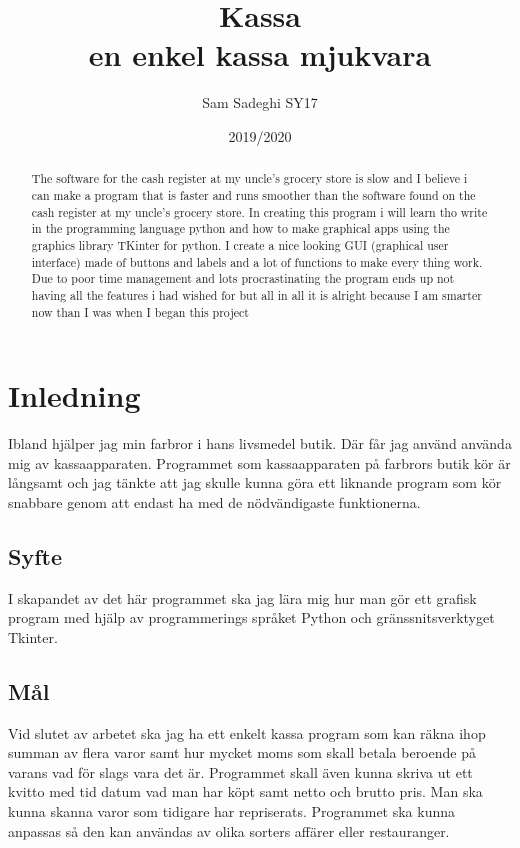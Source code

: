 \documentclass[a4paper, 12pt]{article}
\title{Kassa\\\large en enkel kassa mjukvara}
\author{Sam Sadeghi SY17}
\date{2019/2020}
\begin{document}
\begin{titlepage}
\maketitle
\end{titlepage}


\begin{abstract}
The software for the cash register at my uncle's grocery store is slow and I believe i can make a program that is faster and runs smoother than the software found on the cash register at my uncle's grocery store.
 In creating this program i will learn tho write in the programming language python and how to make graphical apps using the graphics library TKinter for python.
I create a nice looking GUI (graphical user interface) made of buttons and labels and a lot of functions to make every thing work.
Due to poor time management and lots procrastinating the program ends up not having all the features i had wished for but all in all it is alright because I am smarter now than I was when I began this project
\end{abstract}
\newpage
\tableofcontents
\newpage

\section{Inledning}
Ibland hjälper jag min farbror i hans livsmedel butik. 
Där får jag använd använda mig av kassaapparaten. 
Programmet som kassaapparaten på farbrors butik kör är långsamt och jag tänkte att jag skulle kunna göra ett liknande program som kör snabbare genom att endast ha med de nödvändigaste funktionerna.

\subsection{Syfte}

I skapandet av det här programmet ska jag lära mig hur man gör ett grafisk program med hjälp av programmerings språket Python och gränssnitsverktyget Tkinter. 

\subsection{Mål}

Vid slutet av arbetet ska jag ha ett enkelt kassa program som kan räkna ihop summan av flera varor samt hur mycket moms som skall betala beroende på varans vad för slags vara det är.
 Programmet skall även kunna skriva ut ett kvitto med tid datum vad man har köpt samt netto och brutto pris.
 Man ska kunna skanna varor som tidigare har repriserats.
 Programmet ska kunna anpassas så den kan användas av olika sorters affärer eller restauranger.
\end{document}
